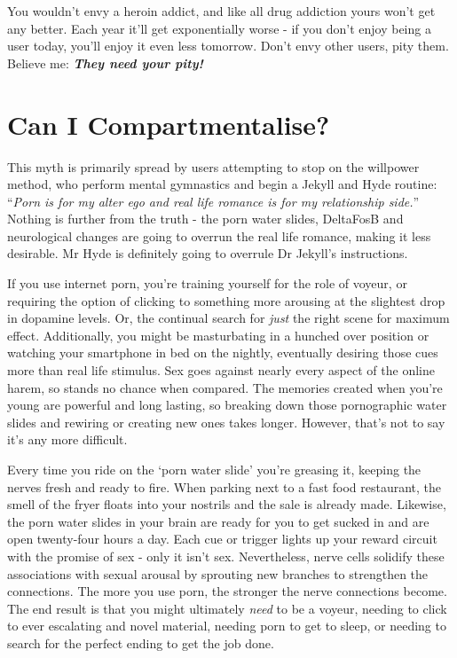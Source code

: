 \documentclass[
]{book}
\begin{document}
You wouldn't envy a heroin addict, and like all drug addiction yours won't get any better. Each year it'll get exponentially worse - if you don't enjoy being a user today, you'll enjoy it even less tomorrow. Don't envy other users, pity them. Believe me: \textbf{\emph{They need your pity!}}

\hypertarget{can-i-compartmentalise}{%
\chapter{Can I Compartmentalise?}\label{can-i-compartmentalise}}

This myth is primarily spread by users attempting to stop on the willpower method, who perform mental gymnastics and begin a Jekyll and Hyde routine: ``\emph{Porn is for my alter ego and real life romance is for my relationship side.}'' Nothing is further from the truth - the porn water slides, DeltaFosB and neurological changes are going to overrun the real life romance, making it less desirable. Mr Hyde is definitely going to overrule Dr Jekyll's instructions.

If you use internet porn, you're training yourself for the role of voyeur, or requiring the option of clicking to something more arousing at the slightest drop in dopamine levels. Or, the continual search for \emph{just} the right scene for maximum effect. Additionally, you might be masturbating in a hunched over position or watching your smartphone in bed on the nightly, eventually desiring those cues more than real life stimulus. Sex goes against nearly every aspect of the online harem, so stands no chance when compared. The memories created when you're young are powerful and long lasting, so breaking down those pornographic water slides and rewiring or creating new ones takes longer. However, that's not to say it's any more difficult.

Every time you ride on the `porn water slide' you're greasing it, keeping the nerves fresh and ready to fire. When parking next to a fast food restaurant, the smell of the fryer floats into your nostrils and the sale is already made. Likewise, the porn water slides in your brain are ready for you to get sucked in and are open twenty-four hours a day. Each cue or trigger lights up your reward circuit with the promise of sex - only it isn't sex. Nevertheless, nerve cells solidify these associations with sexual arousal by sprouting new branches to strengthen the connections. The more you use porn, the stronger the nerve connections become. The end result is that you might ultimately \emph{need} to be a voyeur, needing to click to ever escalating and novel material, needing porn to get to sleep, or needing to search for the perfect ending to get the job done.
\end{document}

